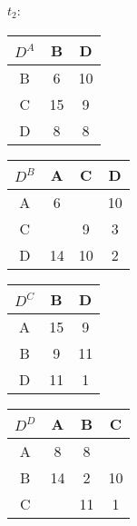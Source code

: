\documentclass[a4paper]{article}
\begin{document}
\paragraph{$t_2:$}
\begin{center}
  \begin{tabular}{|c|c|c|}
    \hline
    $D^A$ & B & D \\ \hline
    B & 6 & 10 \\ \hline
    C & 15 & 9 \\ \hline
    D & 8 & 8 \\
    \hline
  \end{tabular}
  \begin{tabular}{|c|c|c|c|}
    \hline
    $D^B$ & A & C & D \\ \hline
    A & 6 &  & 10\\ \hline
    C &  &9 & 3 \\ \hline
    D & 14 & 10 & 2 \\
    \hline
  \end{tabular} \begin{tabular}{|c|c|c|}
    \hline
    $D^C$ & B & D \\ \hline
    A & 15 & 9  \\ \hline
    B & 9 &  11\\ \hline
    D & 11 & 1 \\
    \hline
  \end{tabular}
  \begin{tabular}{|c|c|c|c|}
    \hline
    $D^D$ & A & B & C \\ \hline
    A & 8 & 8 &  \\ \hline
    B & 14 &2 &10 \\ \hline
    C &  & 11 & 1 \\
    \hline
  \end{tabular}
\end{center}
\end{document}
